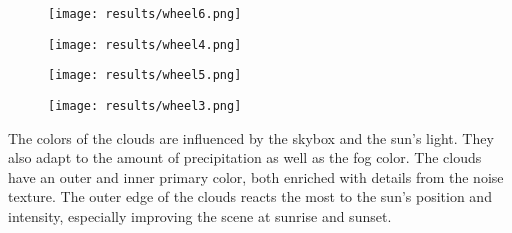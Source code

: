 \begin{figure}[H]
    \centering
        \begin{minipage}{0.47\linewidth}
            \texttt{[image: results/wheel6.png]}
            \label{img:result:3}
        \end{minipage}
    \hfill
        \begin{minipage}{0.47\linewidth}
            \texttt{[image: results/wheel4.png]}
            \label{img:result:4}
        \end{minipage}
\end{figure}


\begin{figure}[H]
    \centering
        \begin{minipage}{0.47\linewidth}
            \texttt{[image: results/wheel5.png]}
            \label{img:result:5}
        \end{minipage}
    \hfill
        \begin{minipage}{0.47\linewidth}
            \texttt{[image: results/wheel3.png]}
            \label{img:result:6}
        \end{minipage}
\end{figure}

\noindent
The colors of the clouds are influenced by the skybox and the sun's light. They also adapt to the amount of \gls{precipitation} as well as the fog color.
The clouds have an outer and inner primary color, both enriched with details from the \gls{noise} texture.
The outer edge of the clouds reacts the most to the sun's position and intensity, especially improving the scene at sunrise and sunset.

\clearpage

